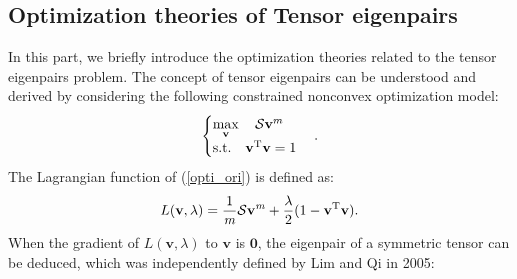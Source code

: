 







\subsection{Optimization  theories of  Tensor eigenpairs}
In this part,  we briefly  introduce the  optimization theories   related to the tensor  eigenpairs problem. 
The  concept  of  tensor  eigenpairs  can be    understood  and  derived  by  considering  the  following   constrained  nonconvex optimization  model:
\begin{equation}\label{opti_ori}
\begin{cases}
\max\limits_{\mathbf v} \quad \mathcal S \mathbf v^{m}   \\
\rm s.t. \quad \mathbf v^{\mathrm {T}}\mathbf v=1
\end{cases}.
\end{equation}
The Lagrangian function 
of (\ref{opti_ori})  is  defined as:
\begin{equation}\label{Lagrangian_function}
L(\mathbf v, \lambda)=
\frac {1}  {\it m}
\mathcal S \mathbf v^{\it m}
+
\frac { \lambda} {2} (1-  \mathbf v^{\mathrm {T}}\mathbf v).
\end{equation}
When the gradient of
$  L(\mathbf v, \lambda) $ to
$ \mathbf  v $ is  $ \mathbf 0$,    the eigenpair of a  symmetric  tensor can  be  deduced,  which  was  independently    defined  by   Lim  and  Qi  in  2005:


